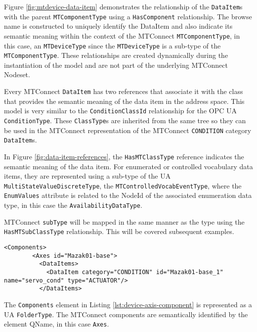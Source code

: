 

Figure \ref{fig:mtdevice-data-item} demonstrates the relationship of the \texttt{Data\-Item}s with the parent \texttt{MTComponent\-Type} using a \texttt{Has\-Component} relationship. The browse name is constructed to uniquely identify the DataItem and also indicate its semantic meaning within the context of the MTConnect \texttt{MTComponent\-Type}, in this case, an \texttt{MTDevice\-Type} since the \texttt{MTDevice\-Type} is a sub-type of the \texttt{MTComponent\-Type}. These relationships are created dynamically during the instantiation of the model and are not part of the underlying MTConnect Nodeset.

Every MTConnect \texttt{Data\-Item} has two references that associate it with the class that provides the semantic meaning of the data item in the address space. This model is very similar to the \texttt{Condition\-Class\-Id} relationship for the OPC UA \texttt{Condition\-Type}. These \texttt{Class\-Type}s are inherited from the same tree so they can be used in the MTConnect representation of the MTConnect \texttt{CONDITION} category \texttt{Data\-Item}s.



In Figure \ref{fig:data-item-references}, the \texttt{HasMTClassType} reference indicates the semantic meaning of the data item. For enumerated or controlled vocabulary data items, they are represented using a sub-type of the UA \texttt{Multi\-State\-Value\-Discrete\-Type}, the \texttt{MTControlled\-Vocab\-Event\-Type}, where the \texttt{Enum\-Values} attribute is related to the NodeId of the associated enumeration data type, in this case the \texttt{Availability\-Data\-Type}.

MTConnect \texttt{subType} will be mapped in the same manner as the type using the \texttt{HasMTSub\-Class\-Type} relationship. This will be covered subsequent examples.

\begin{lstlisting}[firstnumber=last,%
    caption={Components and Conditions},label={lst:device-axis-component}]
      <Components>
        <Axes id="Mazak01-base">
          <DataItems>
            <DataItem category="CONDITION" id="Mazak01-base_1" name="servo_cond" type="ACTUATOR"/>
          </DataItems>
\end{lstlisting}

The \texttt{Components} element in Listing \ref{lst:device-axis-component} is represented as a UA \texttt{Folder\-Type}. The MTConnect components are semantically identified by the element QName, in this case \texttt{Axes}. 

